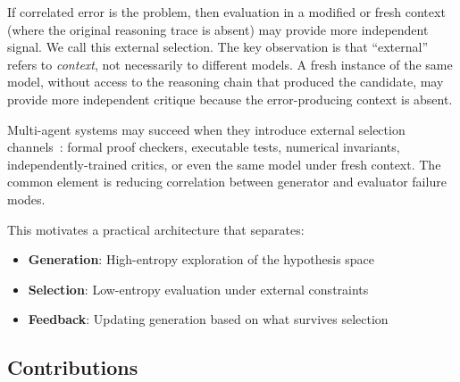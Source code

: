 \documentclass[11pt]{article}
\begin{document}
If correlated error is the problem, then evaluation in a modified or fresh context (where
the original reasoning trace is absent) may provide more independent signal. We call this
external selection. The key observation is that ``external'' refers to \textit{context}, not
necessarily to different models. A fresh instance of the same model, without access to the
reasoning chain that produced the candidate, may provide more independent critique because
the error-producing context is absent.

Multi-agent systems may succeed when they introduce external selection channels~\citep{du2023debate}:
formal proof checkers, executable tests, numerical invariants, independently-trained critics,
or even the same model under fresh context. The common element is reducing correlation
between generator and evaluator failure modes.

This motivates a practical architecture that separates:
\begin{itemize}
    \item \textbf{Generation}: High-entropy exploration of the hypothesis space
    \item \textbf{Selection}: Low-entropy evaluation under external constraints
    \item \textbf{Feedback}: Updating generation based on what survives selection
\end{itemize}

\subsection{Contributions}
\end{document}

